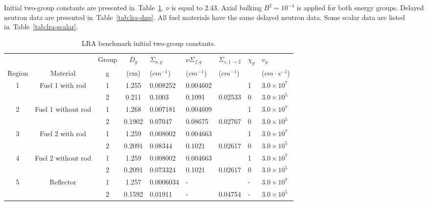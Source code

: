 \documentclass[10pt]{scrartcl}
\newcommand{\tbl}[1]{Table~\ref{#1}}                     %
\begin{document}
Initial two-group constants are presented in~\tbl{tab:lra-xs}.
$\nu$ is equal to 2.43.
Axial bulking $B^2 = 10^{-4}$ is applied for both energy groups.
Delayed neutron data are presented in~\tbl{tab:lra-dnp}.
All fuel materials have the same delayed neutron data.
Some scalar data are listed in~\tbl{tab:lra-scalar}.\\
\begin{table}[H]
    \centering
    \caption{LRA benchmark initial two-group constants.\label{tab:lra-xs}}
      \begin{tabular}{|c|c|c|c|l|l|l|l|l|}
      \hline
             &                 & Group   & $D_g$      & $\Sigma_{a,g}$ & $\nu\Sigma_{f,g}$ & $\Sigma_{s,1\rightarrow 2}$ & $\chi_g$ & $v_g$              \\
      Region & Material        &       g & (cm)       &  ($cm^{-1}$)   &  ($cm^{-1}$)      &  ($cm^{-1}$)                &          & ($cm\cdot s^{-1}$) \\
      \hline
      1      & Fuel 1 with rod & 1       & 1.255      & 0.008252       & 0.004602          &                             & 1        & $3.0\times10^7$    \\
             &                 & 2       & 0.211      & 0.1003         & 0.1091            & 0.02533                     & 0        & $3.0\times10^5$    \\
      \hline
      2      & Fuel 1 without rod & 1    & 1.268      & 0.007181       & 0.004609          &                             & 1        & $3.0\times10^7$    \\
             &                    & 2    & 0.1902     & 0.07047        & 0.08675           & 0.02767                     & 0        & $3.0\times10^5$    \\
      \hline
      3      & Fuel 2 with rod & 1       & 1.259      & 0.008002       & 0.004663          &                             & 1        & $3.0\times10^7$    \\
             &                 & 2       & 0.2091     & 0.08344        & 0.1021            & 0.02617                     & 0        & $3.0\times10^5$    \\
      \hline
      4      & Fuel 2 without rod & 1    & 1.259      & 0.008002       & 0.004663          &                             & 1        & $3.0\times10^7$    \\
             &                    & 2    & 0.2091     & 0.073324       & 0.1021            & 0.02617                     & 0        & $3.0\times10^5$    \\
      \hline
      5      & Reflector        & 1      & 1.257      & 0.0006034      & -                 &                             & -        & $3.0\times10^7$    \\
             &                  & 2      & 0.1592     & 0.01911        & -                 & 0.04754                     & -        & $3.0\times10^5$    \\
      \hline
      \end{tabular}
\end{table}
\end{document}
